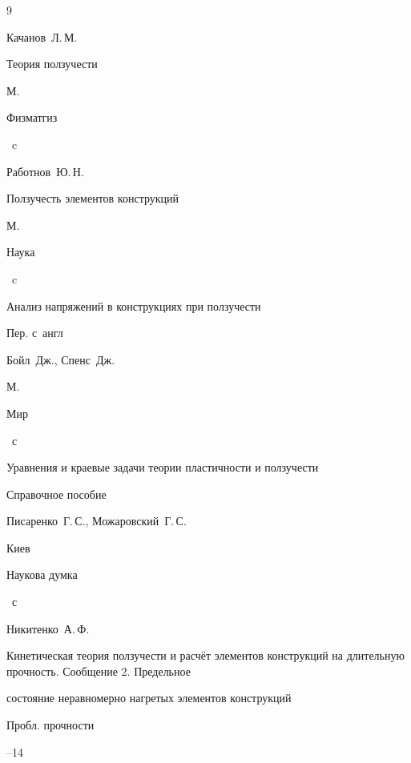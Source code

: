 \begin{thebibliography}{9}


\by Качанов~Л.\,М.

\book Теория ползучести

\publaddr М.

\publ Физматгиз


~c




\by Работнов~Ю.\,Н.

\book  Ползучесть элементов конструкций

\publaddr М.

\publ Наука


~c




\book Анализ напряжений в конструкциях при ползучести

\bookinfo Пер. с~англ

\by Бойл~Дж., Спенс~Дж.

\publaddr М.

\publ Мир


~с




\book Уравнения и краевые задачи теории пластичности и ползучести

\bookinfo Справочное пособие

\by Писаренко~Г.\,С., Можаровский~Г.\,С.

\publaddr Киев

\publ Наукова думка


~с




  \by Никитенко~А.\,Ф.

\paper  Кинетическая теория ползучести и расчёт элементов конструкций на длительную прочность. Сообщение 2. Предельное

состояние неравномерно нагретых элементов конструкций

 \jour Пробл. прочности



--14



\end{thebibliography}



\makeengtitlem




%


% 

